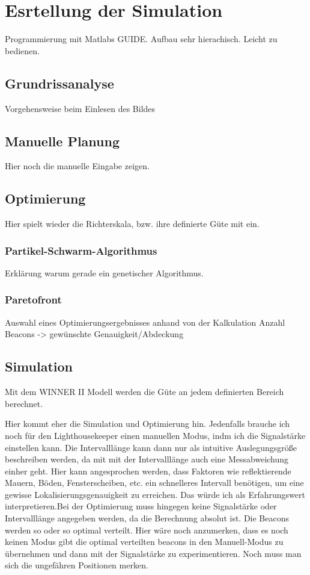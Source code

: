 \section{Esrtellung der Simulation}
Programmierung mit Matlabs GUIDE. Aufbau sehr hierachisch. Leicht zu bedienen. 
\subsection{Grundrissanalyse}
Vorgehensweise beim Einlesen des Bildes
\subsection{Manuelle Planung}
Hier noch die manuelle Eingabe zeigen.
\subsection{Optimierung}
Hier spielt wieder die Richterskala, bzw. ihre definierte Güte mit ein.
\subsubsection{Partikel-Schwarm-Algorithmus}
Erklärung warum gerade ein genetischer Algorithmus. 
\subsubsection{Paretofront}
Auswahl eines Optimierungsergebnisses anhand von der Kalkulation Anzahl Beacons -> gewünschte Genauigkeit/Abdeckung
\subsection{Simulation}
Mit dem WINNER II Modell werden die Güte an jedem definierten Bereich berechnet.


Hier kommt eher die Simulation und Optimierung hin. Jedenfalls brauche ich noch für den Lighthousekeeper einen manuellen Modus, indm ich die Signalstärke einstellen kann. Die Intervalllänge kann dann nur als intuitive Auslegungsgröße beschreiben werden, da mit mit der Intervalllänge auch eine Messabweichung einher geht. Hier kann angesprochen werden, dass Faktoren wie reflektierende Mauern, Böden, Fensterscheiben, etc. ein schnelleres Intervall benötigen, um eine gewisse Lokalisierungsgenauigkeit zu erreichen. Das würde ich als Erfahrungswert interpretieren.Bei der Optimierung muss hingegen keine Signalstärke oder Intervalllänge angegeben werden, da die Berechnung absolut ist. Die Beacons werden so oder so optimal verteilt. Hier wäre noch anzumerken, dass es noch keinen Modus gibt die optimal verteilten beacons in den Manuell-Modus zu übernehmen und dann mit der Signalstärke zu experimentieren. Noch muss man sich die ungefähren Positionen merken.
